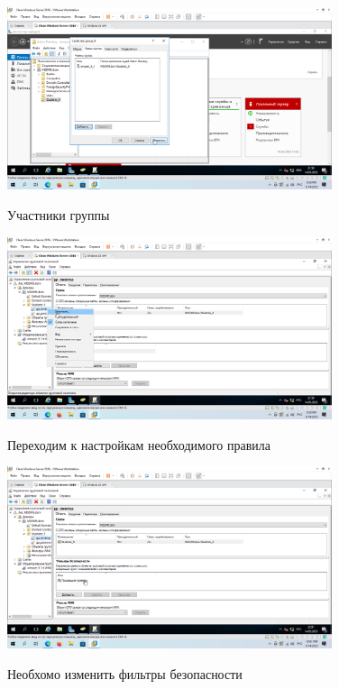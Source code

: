 \documentclass[a4paper]{article}
\begin{document}
  \begin{figure}[H]
    \centering
    \includegraphics[width=0.85\textwidth]{5_0159}
    \label{img:159}
    \caption{Участники группы}
  \end{figure}

  \begin{figure}[H]
    \centering
    \includegraphics[width=0.85\textwidth]{5_0160}
    \label{img:160}
    \caption{Переходим к настройкам необходимого правила}
  \end{figure}

  \begin{figure}[H]
    \centering
    \includegraphics[width=0.85\textwidth]{5_0161}
    \label{img:161}
    \caption{Необхомо изменить фильтры безопасности}
  \end{figure}
\end{document}

